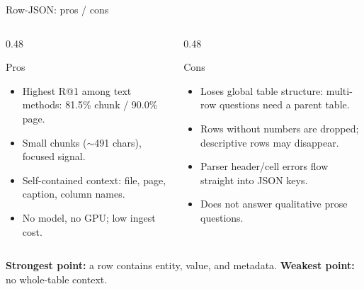 \documentclass[aspectratio=169,11pt]{beamer}
\begin{document}
\begin{frame}{Row-JSON: pros / cons}
  \begin{columns}[T]
    \begin{column}{0.48\textwidth}
      \begin{block}{Pros}
        \begin{itemize}\footnotesize
          \item Highest R@1 among text methods: 81.5\% chunk / 90.0\% page.
          \item Small chunks ($\sim$491 chars), focused signal.
          \item Self-contained context: file, page, caption, column names.
          \item No model, no GPU; low ingest cost.
        \end{itemize}
      \end{block}
    \end{column}
    \begin{column}{0.48\textwidth}
      \begin{block}{Cons}
        \begin{itemize}\footnotesize
          \item Loses global table structure: multi-row questions need a
            parent table.
          \item Rows without numbers are dropped; descriptive rows may disappear.
          \item Parser header/cell errors flow straight into JSON keys.
          \item Does not answer qualitative prose questions.
        \end{itemize}
      \end{block}
    \end{column}
  \end{columns}

  \vfill
  {\footnotesize
  \textbf{Strongest point:} a row contains entity, value, and metadata.
  \quad\textbf{Weakest point:} no whole-table context.}
\end{frame}
\end{document}
